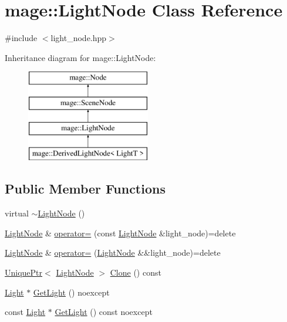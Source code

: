 \hypertarget{classmage_1_1_light_node}{}\section{mage\+:\+:Light\+Node Class Reference}
\label{classmage_1_1_light_node}


{\ttfamily \#include $<$light\+\_\+node.\+hpp$>$}

Inheritance diagram for mage\+:\+:Light\+Node\+:\begin{figure}[H]
\begin{center}
\leavevmode
\includegraphics[height=4.000000cm]{classmage_1_1_light_node}
\end{center}
\end{figure}
\subsection*{Public Member Functions}
\begin{DoxyCompactItemize}
\item 
virtual \hyperlink{classmage_1_1_light_node_ad0c650ac0059589c28a3d1cfec95c07d}{$\sim$\+Light\+Node} ()
\item 
\hyperlink{classmage_1_1_light_node}{Light\+Node} \& \hyperlink{classmage_1_1_light_node_a41e3ee25215ccc1cbaed4b73e393930a}{operator=} (const \hyperlink{classmage_1_1_light_node}{Light\+Node} \&light\+\_\+node)=delete
\item 
\hyperlink{classmage_1_1_light_node}{Light\+Node} \& \hyperlink{classmage_1_1_light_node_abda92f7cf2ce3aed3af94d2278e2bfa1}{operator=} (\hyperlink{classmage_1_1_light_node}{Light\+Node} \&\&light\+\_\+node)=delete
\item 
\hyperlink{namespacemage_a3316d7143a973e37adf1110f2e80ca31}{Unique\+Ptr}$<$ \hyperlink{classmage_1_1_light_node}{Light\+Node} $>$ \hyperlink{classmage_1_1_light_node_a4d0c10f03de71cd497635feb431d02d5}{Clone} () const
\item 
\hyperlink{classmage_1_1_light}{Light} $\ast$ \hyperlink{classmage_1_1_light_node_a2b971e64ec2267d49c2ba96a00662d3b}{Get\+Light} () noexcept
\item 
const \hyperlink{classmage_1_1_light}{Light} $\ast$ \hyperlink{classmage_1_1_light_node_a015453d1751cf3ad78846e972957bb5b}{Get\+Light} () const noexcept
\end{DoxyCompactItemize}
